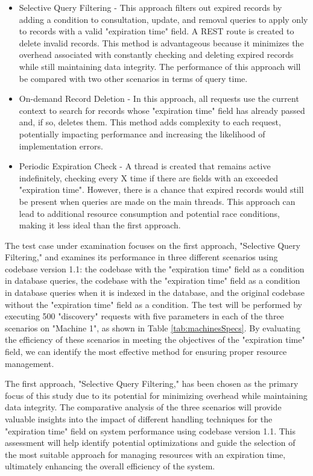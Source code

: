 \documentclass[a4paper,fleqn]{cas-dc}
\begin{document}
\begin{itemize}
	\item Selective Query Filtering - This approach filters out expired records by adding a condition to consultation, update, and removal queries to apply only to records with a valid "expiration time" field. A REST route is created to delete invalid records. This method is advantageous because it minimizes the overhead associated with constantly checking and deleting expired records while still maintaining data integrity. The performance of this approach will be compared with two other scenarios in terms of query time.
	\item On-demand Record Deletion - In this approach, all requests use the current context to search for records whose "expiration time" field has already passed and, if so, deletes them. This method adds complexity to each request, potentially impacting performance and increasing the likelihood of implementation errors.
	\item Periodic Expiration Check - A thread is created that remains active indefinitely, checking every X time if there are fields with an exceeded "expiration time". However, there is a chance that expired records would still be present when queries are made on the main threads. This approach can lead to additional resource consumption and potential race conditions, making it less ideal than the first approach.
\end{itemize}

The test case under examination focuses on the first approach, "Selective Query Filtering," and examines its performance in three different scenarios using codebase version 1.1: the codebase with the "expiration time" field as a condition in database queries, the codebase with the "expiration time" field as a condition in database queries when it is indexed in the database, and the original codebase without the "expiration time" field as a condition. The test will be performed by executing 500 "discovery" requests with five parameters in each of the three scenarios on "Machine 1", as shown in Table \ref{tab:machinesSpecs}. By evaluating the efficiency of these scenarios in meeting the objectives of the "expiration time" field, we can identify the most effective method for ensuring proper resource management.

The first approach, "Selective Query Filtering," has been chosen as the primary focus of this study due to its potential for minimizing overhead while maintaining data integrity. The comparative analysis of the three scenarios will provide valuable insights into the impact of different handling techniques for the "expiration time" field on system performance using codebase version 1.1. This assessment will help identify potential optimizations and guide the selection of the most suitable approach for managing resources with an expiration time, ultimately enhancing the overall efficiency of the system.
\end{document}

